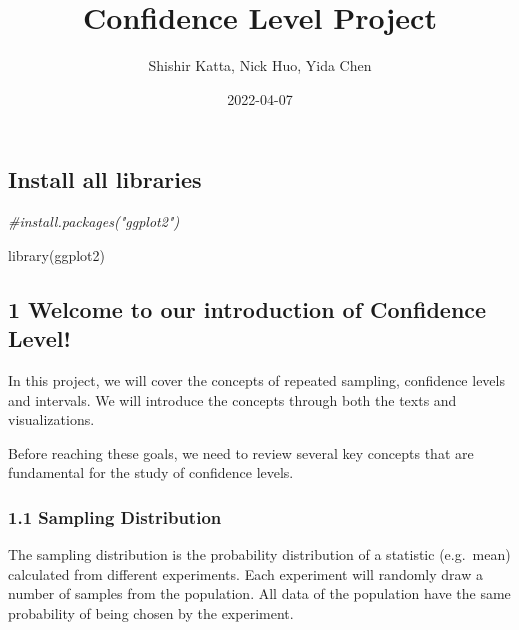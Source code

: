\documentclass[
]{article}
\title{Confidence Level Project}
\author{Shishir Katta, Nick Huo, Yida Chen}
\date{2022-04-07}
\newenvironment{Shaded}{\begin{snugshade}}{\end{snugshade}}
\newcommand{\CommentTok}[1]{\textcolor[rgb]{0.56,0.35,0.01}{\textit{#1}}}
\newcommand{\FunctionTok}[1]{\textcolor[rgb]{0.00,0.00,0.00}{#1}}
\newcommand{\NormalTok}[1]{#1}
\begin{document}
\maketitle

\hypertarget{install-all-libraries}{%
\subsection{Install all libraries}\label{install-all-libraries}}

\begin{Shaded}
\begin{Highlighting}[]
\CommentTok{\#install.packages("ggplot2")}
\end{Highlighting}
\end{Shaded}

\begin{Shaded}
\begin{Highlighting}[]
\FunctionTok{library}\NormalTok{(ggplot2)}
\end{Highlighting}
\end{Shaded}

\hypertarget{welcome-to-our-introduction-of-confidence-level}{%
\subsection{\texorpdfstring{1 Welcome to our introduction of Confidence
Level!\\
}{1 Welcome to our introduction of Confidence Level! }}\label{welcome-to-our-introduction-of-confidence-level}}

In this project, we will cover the concepts of repeated sampling,
confidence levels and intervals. We will introduce the concepts through
both the texts and visualizations.

Before reaching these goals, we need to review several key concepts that
are fundamental for the study of confidence levels.

\hypertarget{sampling-distribution}{%
\subsubsection{1.1 Sampling Distribution}\label{sampling-distribution}}

The sampling distribution is the probability distribution of a statistic
(e.g.~mean) calculated from different experiments. Each experiment will
randomly draw a number of samples from the population. All data of the
population have the same probability of being chosen by the experiment.
\end{document}
